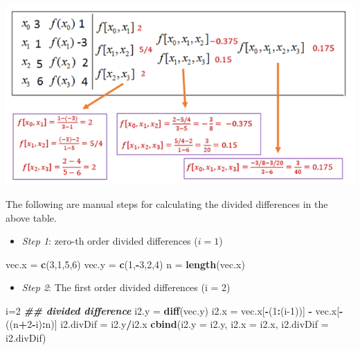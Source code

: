 \documentclass[
]{book}
\newenvironment{Shaded}{\begin{snugshade}}{\end{snugshade}}
\newcommand{\AttributeTok}[1]{\textcolor[rgb]{0.13,0.29,0.53}{#1}}
\newcommand{\DecValTok}[1]{\textcolor[rgb]{0.00,0.00,0.81}{#1}}
\newcommand{\DocumentationTok}[1]{\textcolor[rgb]{0.56,0.35,0.01}{\textbf{\textit{#1}}}}
\newcommand{\FunctionTok}[1]{\textcolor[rgb]{0.13,0.29,0.53}{\textbf{#1}}}
\newcommand{\NormalTok}[1]{#1}
\newcommand{\OtherTok}[1]{\textcolor[rgb]{0.56,0.35,0.01}{#1}}
\newcommand{\SpecialCharTok}[1]{\textcolor[rgb]{0.81,0.36,0.00}{\textbf{#1}}}
\providecommand{\tightlist}{%
  \setlength{\itemsep}{0pt}\setlength{\parskip}{0pt}}
\begin{document}
\begin{center}\includegraphics[width=0.7\linewidth]{img06/w06-DividedDifferenceTableExample} \end{center}

The following are manual steps for calculating the divided differences in the above table.

\begin{itemize}
\tightlist
\item
  \emph{Step 1}: zero-th order divided differences (\(i = 1\))
\end{itemize}

\begin{Shaded}
\begin{Highlighting}[]
\NormalTok{vec.x }\OtherTok{=} \FunctionTok{c}\NormalTok{(}\DecValTok{3}\NormalTok{,}\DecValTok{1}\NormalTok{,}\DecValTok{5}\NormalTok{,}\DecValTok{6}\NormalTok{)          }
\NormalTok{vec.y }\OtherTok{=} \FunctionTok{c}\NormalTok{(}\DecValTok{1}\NormalTok{,}\SpecialCharTok{{-}}\DecValTok{3}\NormalTok{,}\DecValTok{2}\NormalTok{,}\DecValTok{4}\NormalTok{)}
\NormalTok{n }\OtherTok{=} \FunctionTok{length}\NormalTok{(vec.x)}
\end{Highlighting}
\end{Shaded}

\begin{itemize}
\tightlist
\item
  \emph{Step 2}: The first order divided differences (i = 2)
\end{itemize}

\begin{Shaded}
\begin{Highlighting}[]
\NormalTok{i}\OtherTok{=}\DecValTok{2}
\DocumentationTok{\#\# divided difference}
\NormalTok{i2.y }\OtherTok{=} \FunctionTok{diff}\NormalTok{(vec.y)}
\NormalTok{i2.x }\OtherTok{=}\NormalTok{ vec.x[}\SpecialCharTok{{-}}\NormalTok{(}\DecValTok{1}\SpecialCharTok{:}\NormalTok{(i}\DecValTok{{-}1}\NormalTok{))] }\SpecialCharTok{{-}}\NormalTok{ vec.x[}\SpecialCharTok{{-}}\NormalTok{((n}\SpecialCharTok{+}\DecValTok{2}\SpecialCharTok{{-}}\NormalTok{i)}\SpecialCharTok{:}\NormalTok{n)]}
\NormalTok{i2.divDif }\OtherTok{=}\NormalTok{ i2.y}\SpecialCharTok{/}\NormalTok{i2.x}
\FunctionTok{cbind}\NormalTok{(}\AttributeTok{i2.y =}\NormalTok{ i2.y, }\AttributeTok{i2.x =}\NormalTok{ i2.x, }\AttributeTok{i2.divDif =}\NormalTok{ i2.divDif)}
\end{Highlighting}
\end{Shaded}
\end{document}
